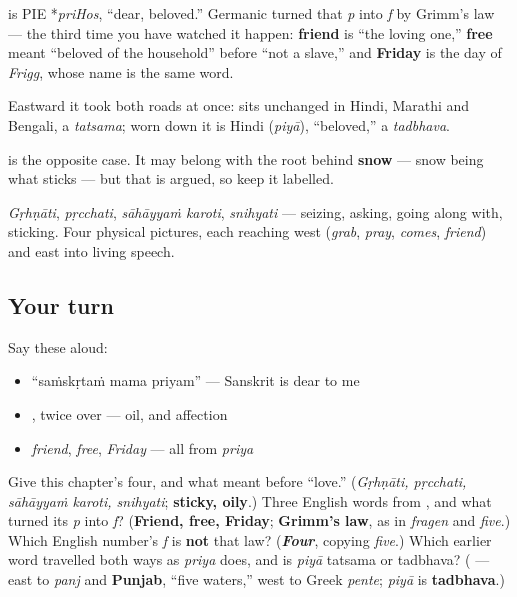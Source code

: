 \begin{cousinweb}
\textbf{} is PIE *\emph{priHos}, \textquotedblleft{}dear, beloved.\textquotedblright{} Germanic turned that \emph{p} into \emph{f} by Grimm's law — the third time you have watched it happen: \textbf{friend} is \textquotedblleft{}the loving one,\textquotedblright{} \textbf{free} meant \textquotedblleft{}beloved of the household\textquotedblright{} before \textquotedblleft{}not a slave,\textquotedblright{} and \textbf{Friday} is the day of \emph{Frigg}, whose name is the same word.

Eastward it took both roads at once: \textbf{} sits unchanged in Hindi, Marathi and Bengali, a \emph{tatsama}; worn down it is Hindi \textbf{} (\emph{piyā}), \textquotedblleft{}beloved,\textquotedblright{} a \emph{tadbhava}.

\textbf{} is the opposite case. It may belong with the root behind \textbf{snow} — snow being what sticks — but that is argued, so keep it labelled.
\end{cousinweb}

\begin{grammarlens}[title={What you've built: four verbs, and a taproot}]
\emph{Gṛhṇāti}, \emph{pṛcchati}, \emph{sāhāyyaṁ karoti}, \emph{snihyati} — seizing, asking, going along with, sticking. Four physical pictures, each reaching west (\emph{grab}, \emph{pray}, \emph{comes}, \emph{friend}) and east into living speech.
\end{grammarlens}

\subsection*{Your turn}
Say these aloud:

\begin{itemize}
\raggedright
  \item \textquotedblleft{}saṁskṛtaṁ mama priyam\textquotedblright{} — Sanskrit is dear to me
  \item {}, twice over — oil, and affection
  \item \emph{friend}, \emph{free}, \emph{Friday} — all from \emph{priya}
\end{itemize}

\begin{tcolorbox}[breakable,colback=teal!4,colframe=teal!35!black,title={Before you move on}]
Give this chapter's four, and what \textbf{} meant before \textquotedblleft{}love.\textquotedblright{} (\emph{Gṛhṇāti, pṛcchati, sāhāyyaṁ karoti, snihyati}; \textbf{sticky, oily}.) Three English words from \textbf{}, and what turned its \emph{p} into \emph{f}? (\textbf{Friend, free, Friday}; \textbf{Grimm's law}, as in \emph{fragen} and \emph{five}.) Which English number's \emph{f} is \textbf{not} that law? (\emph{\textbf{Four}}, copying \emph{five}.) Which earlier word travelled both ways as \emph{priya} does, and is \emph{piyā} tatsama or tadbhava? (\textbf{} — east to \emph{panj} and \textbf{Punjab}, \textquotedblleft{}five waters,\textquotedblright{} west to Greek \emph{pente}; \emph{piyā} is \textbf{tadbhava}.)
\end{tcolorbox}
